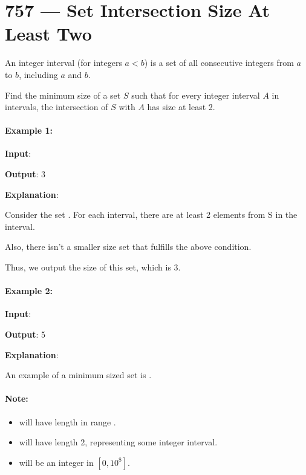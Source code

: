 \section{757 --- Set Intersection Size At Least Two}
An integer interval \fcj{[a, b]} (for integers $a < b$) is a set of all consecutive integers from $a$ to $b$, including $a$ and $b$.

Find the minimum size of a set $S$ such that for every integer interval $A$ in intervals, the intersection of $S$ with $A$ has size at least 2.

\paragraph{Example 1:}

\begin{flushleft}
\textbf{Input}: 

\textbf{Output}: 3

\textbf{Explanation}:

Consider the set .  For each interval, there are at least 2 elements from S in the interval.

Also, there isn't a smaller size set that fulfills the above condition.

Thus, we output the size of this set, which is 3.
\end{flushleft}

\paragraph{Example 2:}

\begin{flushleft}
\textbf{Input}: 

\textbf{Output}: 5

\textbf{Explanation}:

An example of a minimum sized set is \fcj{[1, 2, 3, 4, 5]}.
\end{flushleft}

\paragraph{Note:}

\begin{itemize}
\item {} will have length in range \fcj{[1, 3000]}.
\item {} will have length 2, representing some integer interval.
\item {} will be an integer in $ [0, 10^8] $.
\end{itemize}

